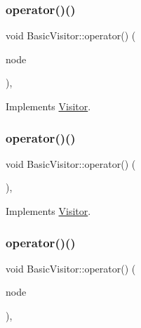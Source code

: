 \subsubsection{\texorpdfstring{operator()()}{operator()()}\hspace{0.1cm}{\footnotesize\ttfamily [9/59]}}
{\footnotesize\ttfamily void Basic\+Visitor\+::operator() (\begin{DoxyParamCaption}\item[{const \hyperlink{struct_object_literal}{Object\+Literal} \&}]{node }\end{DoxyParamCaption})\hspace{0.3cm}{\ttfamily [inline]}, {\ttfamily [virtual]}}



Implements \hyperlink{struct_visitor_ad85d9aa9718801a1a8233cf51d8f7055}{Visitor}.

\mbox{\label{struct_basic_visitor_a324c1fa1804aca5286a60c74b7d67997}} 
\subsubsection{\texorpdfstring{operator()()}{operator()()}\hspace{0.1cm}{\footnotesize\ttfamily [10/59]}}
{\footnotesize\ttfamily void Basic\+Visitor\+::operator() (\begin{DoxyParamCaption}\item[{const \hyperlink{struct_this_expression}{This\+Expression} \&}]{ }\end{DoxyParamCaption})\hspace{0.3cm}{\ttfamily [inline]}, {\ttfamily [virtual]}}



Implements \hyperlink{struct_visitor_ae8eb5856c0ed7ff4840fa9045c886f59}{Visitor}.

\mbox{\label{struct_basic_visitor_a3055e7fe6f87a3b1396a0f334ef5d6b7}} 
\subsubsection{\texorpdfstring{operator()()}{operator()()}\hspace{0.1cm}{\footnotesize\ttfamily [11/59]}}
{\footnotesize\ttfamily void Basic\+Visitor\+::operator() (\begin{DoxyParamCaption}\item[{const \hyperlink{struct_identifier_expression}{Identifier\+Expression} \&}]{node }\end{DoxyParamCaption})\hspace{0.3cm}{\ttfamily [inline]}, {\ttfamily [virtual]}}



